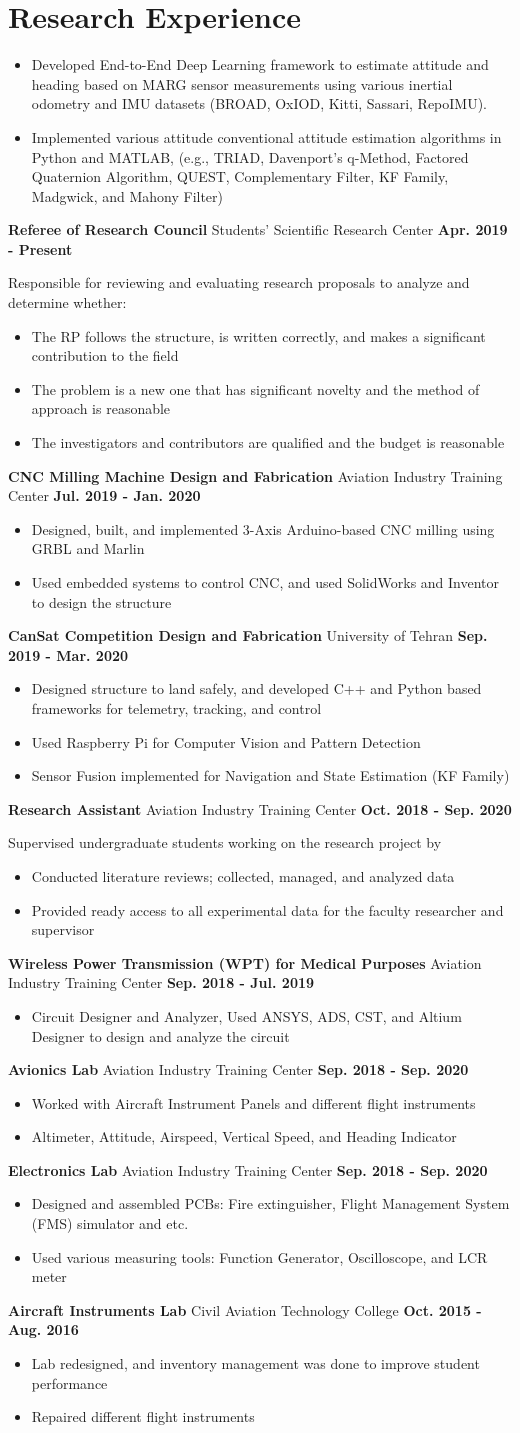 \documentclass[a4,25pt]{article}
\newenvironment{Experience}[1]{
    \section*{#1} \vspace{-.2cm}
    \hspace{.5cm}
    \begin{minipage}{0.95\linewidth}
    }{ \end{minipage}}
\newcommand{\experience}[3]{ 
  \vspace{0.1cm}\textbf{#1}{ #2} \hfill \textbf{#3} \par
}
\newcommand{\expdetail}[1]{
        {#1 } \par
}
\newcommand{\expdetails}[1]{
    \begin{itemize} 
    \item #1 \vspace{1pt}
    \end{itemize} 
}
\begin{document}
\begin{Experience}{Research Experience}
    \expdetails{Developed End-to-End Deep Learning framework to estimate attitude and heading based on MARG sensor measurements using various inertial odometry and IMU datasets (BROAD, OxIOD, Kitti, Sassari, RepoIMU).}
    \expdetails{Implemented various attitude conventional attitude estimation algorithms in Python and MATLAB, (e.g., TRIAD, Davenport’s q-Method, Factored Quaternion Algorithm, QUEST, Complementary Filter, KF Family, Madgwick, and Mahony Filter)}
    \experience{Referee of Research Council}{Students’ Scientific Research Center}{Apr. 2019 - Present}
    \expdetail{Responsible for reviewing and evaluating research proposals to analyze and determine whether:}
    \expdetails{The RP follows the structure, is written correctly, and makes a significant contribution to the field }
    \expdetails{The problem is a new one that has significant novelty and the method of approach is reasonable}
    \expdetails{The investigators and contributors are qualified and the budget is reasonable }
    \experience{CNC Milling Machine Design and Fabrication}{Aviation Industry Training Center}{Jul. 2019 - Jan. 2020}
    \expdetails{Designed, built, and implemented 3-Axis Arduino-based CNC milling using GRBL and Marlin}
    \expdetails{Used embedded systems to control CNC, and used SolidWorks and Inventor to design the structure}
    \experience{CanSat Competition Design and Fabrication}{University of Tehran}{Sep. 2019 - Mar. 2020}
    \expdetails{Designed structure to land safely, and developed C++ and Python based frameworks for telemetry, tracking, and control }
    \expdetails{Used Raspberry Pi for Computer Vision and Pattern Detection }
    \expdetails{Sensor Fusion implemented for Navigation and State Estimation (KF Family)}
    \experience{Research Assistant}{Aviation Industry Training Center}{Oct. 2018 - Sep. 2020}
    \expdetail{Supervised undergraduate students working on the research project by }
    \expdetails{Conducted literature reviews; collected, managed, and analyzed data}
    \expdetails{Provided ready access to all experimental data for the faculty researcher and supervisor }
    \experience{Wireless Power Transmission (WPT) for Medical Purposes}{Aviation Industry Training Center}{Sep. 2018 - Jul. 2019}
    \expdetails{Circuit Designer and Analyzer, Used ANSYS, ADS, CST, and Altium Designer to design and analyze the circuit}
    \experience{Avionics Lab}{Aviation Industry Training Center}{Sep. 2018 - Sep. 2020}
    \expdetails{Worked with Aircraft Instrument Panels and different flight instruments}
    \expdetails{Altimeter, Attitude, Airspeed, Vertical Speed, and Heading Indicator}
    \experience{Electronics Lab}{Aviation Industry Training Center}{Sep. 2018 - Sep. 2020}
    \expdetails{Designed and assembled PCBs: Fire extinguisher, Flight Management System (FMS) simulator and etc.}
    \expdetails{Used various measuring tools: Function Generator, Oscilloscope, and LCR meter}
    \experience{Aircraft Instruments Lab}{Civil Aviation Technology College}{Oct. 2015 - Aug. 2016}
    \expdetails{Lab redesigned, and inventory management was done to improve student performance}
    \expdetails{Repaired different flight instruments }
\end{Experience}
\end{document}
